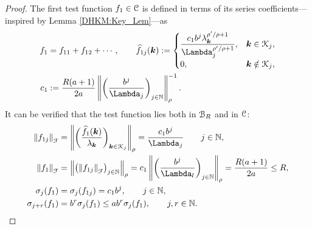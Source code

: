 \documentclass[USenglish]{article}
\theoremstyle{dgthm}
\theoremstyle{dgthm}
\theoremstyle{dgthm}
\theoremstyle{dgthm}
\theoremstyle{dgdef}
\theoremstyle{definition}
\newcommand{\hf}{\widehat{f}}
\newcommand{\norm}[2][{}]{\ensuremath{\left \lVert #2 \right \rVert}_{#1}}
\begin{document}
\begin{proof}
The first test function $f_1 \in {\mathcal{C}}$ is defined in terms of its series coefficients---inspired by Lemma \ref{DHKM:Key_Lem}---as
\begin{align}
\nonumber
f_1 &= f_{11} + f_{12} +  \cdots, \qquad
\hf_{1j}(\bsk) := \begin{cases}
\displaystyle
\frac{c_1 b^{j} \lambda_{\bsk}^{\rho'/\rho+1}}{\Lambda_j^{\rho'/\rho+1}},  & \bsk \in \calK_j,
\\
0, & \bsk \notin \calK_j,
\end{cases}
\\
\nonumber
c_1 &:=  \frac{R(a+1)}{2a} \norm[\rho]{ \biggl(\frac{b^{j}}{\Lambda_j} \biggr)_{j \in \N} }^{-1}.
\end{align}
It can be verified that the test function lies both in ${\mathcal{B}}_{R}$ and in ${\mathcal{C}}$:
\begin{align}
\nonumber
\norm[\calF]{f_{1j}} &= \norm[\rho]{\biggl(\frac{\hf_1(\bsk)}{\lambda_{\bsk}} \biggr)_{\bsk \in \calK_j}} 
= \frac{c_1 b^j}{\Lambda_j} \qquad j \in \N,\\
\nonumber
\norm[\calF]{f_1} &= \norm[\rho]{\bigl( \norm[\calF]{f_{1j}} \bigr)_{j \in \N} } 
=  c_1 \norm[\rho]{ \biggl(\frac{b^{j}}{\Lambda_l} \biggr)_{j \in \N} } = \frac{R(a+1)}{2a} \le R,
\\
\nonumber
\sigma_j(f_1) &= \sigma_j(f_{1j}) = 
c_1 b^{j}, \qquad j \in \N, 
\\
\nonumber
\sigma_{j+r}(f_1) &= 
b^{r} \sigma_j(f_1) \le a b^r \sigma_j(f_1), \qquad j,r \in \N.
\end{align}


\end{proof}
\end{document}
